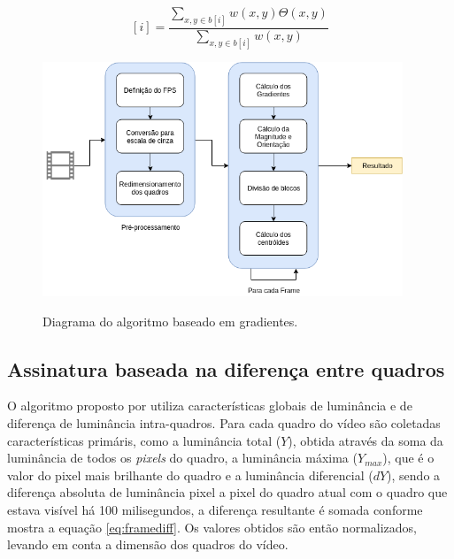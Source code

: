\begin{equation}
	\label{eq:gradientes}
	[i] = \frac{\sum_{x,y \in b[i]} w(x,y)\Theta (x,y)}{\sum_{x,y \in b[i]} w(x,y)}
\end{equation}

 \begin{figure}[h]
      \centering
      \caption{Diagrama do algoritmo baseado em gradientes.}
      \includegraphics[width=0.96\textwidth]{dados/figuras/Gradientes.png}
       	\label{fig:dia_gradiente}
    \end{figure}  
    
%
%

\subsection{Assinatura baseada na diferença entre quadros}
\label{sec:framediff}

  O algoritmo proposto por \citeauthor{cook2011efficient} utiliza características globais de luminância e de diferença de luminância intra-quadros. Para cada quadro do vídeo são coletadas características primáris, como a luminância total ($Y$), obtida através da soma da luminância de todos os \textit{pixels} do quadro, a luminância máxima ($Y_{max}$), que é o valor do pixel mais brilhante do quadro e a luminância diferencial ($dY$), sendo a diferença absoluta de luminância pixel a pixel do quadro atual com o quadro que estava visível há 100 milisegundos, a diferença resultante é somada conforme mostra a equação \ref{eq:framediff}. Os valores obtidos são então normalizados, levando em conta a dimensão dos quadros do vídeo.
  

